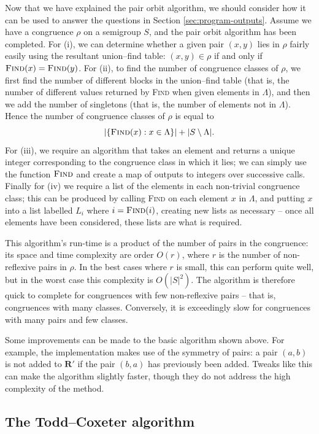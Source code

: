 Now that we have explained the pair orbit algorithm, we should consider how it
can be used to answer the questions in Section \ref{sec:program-outputs}.
Assume we have a congruence $\rho$ on a semigroup $S$, and the pair orbit
algorithm has been completed.  For (i), we can determine whether a given pair $(x,y)$
lies in $\rho$ fairly easily using the resultant union--find table: $(x,y) \in
\rho$ if and only if $\textsc{Find}(x) = \textsc{Find}(y)$.  For (ii), to find the number
of congruence classes of $\rho$, we first find the number of different blocks in
the union--find table (that is, the number of different values returned by
\textsc{Find} when given elements in $\Lambda$), and then we add the number of
singletons (that is, the number of elements not in $\Lambda$).  Hence the number
of congruence classes of $\rho$ is equal to
$$|\{\textsc{Find}(x): x \in \Lambda\}| + |S \setminus \Lambda|.$$
For (iii), we require an algorithm that takes an element and returns a unique
integer corresponding to the congruence class in which it lies; we can simply
use the function $\textsc{Find}$ and create a map of outputs to integers over
successive calls.  Finally for (iv) we require a list of the
elements in each non-trivial congruence class; this can be produced by calling
\textsc{Find} on each element $x$ in $\Lambda$, and putting $x$ into a list
labelled $L_i$ where $i = \textsc{Find}(i)$, creating new lists as necessary --
once all elements have been considered, these lists are what is required.

This algorithm's run-time is a product of the number of pairs in the congruence:
its space and time complexity are order $O(r)$, where $r$ is the number of
non-reflexive pairs in $\rho$.  In the best cases where $r$ is small, this can
perform quite well, but in the worst case this complexity is $O(|S|^2)$.
The algorithm is therefore quick to complete for congruences with few
non-reflexive pairs -- that is, congruences with many classes.  Conversely, it is
exceedingly slow for congruences with many pairs and few classes.

Some improvements can be made to the basic algorithm shown above.  For example,
the \libsemigroups{} implementation makes use of the symmetry of pairs: a
pair $(a,b)$ is not added to $\mathbf{R}'$ if the pair $(b,a)$ has previously
been added.  Tweaks like this can make the algorithm slightly faster, though
they do not address the high complexity of the method.

\subsection{The Todd--Coxeter algorithm}
\label{sec:tc}

